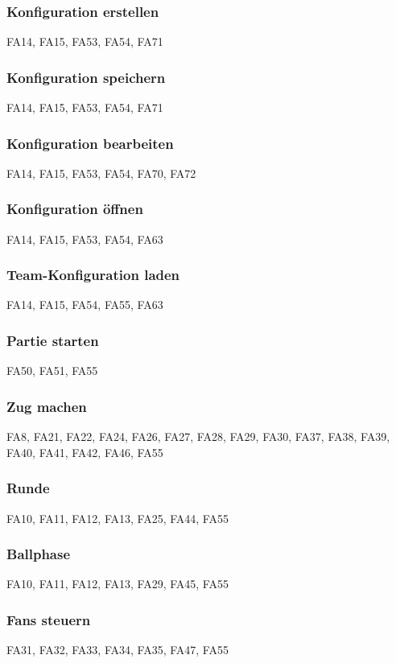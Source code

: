 \subsubsection{Konfiguration erstellen}
FA14,
FA15, 
FA53, 
FA54, 
FA71

\subsubsection{Konfiguration speichern}
FA14,
FA15, 
FA53, 
FA54, 
FA71

\subsubsection{Konfiguration bearbeiten}
FA14,
FA15, 
FA53, 
FA54, 
FA70, 
FA72

\subsubsection{Konfiguration öffnen}
FA14,
FA15, 
FA53, 
FA54, 
FA63

\subsubsection{Team-Konfiguration laden}
FA14,
FA15, 
FA54, 
FA55, 
FA63

\subsubsection{Partie starten}
FA50,
FA51, 
FA55

\subsubsection{Zug machen}
FA8,
FA21, 
FA22, 
FA24, 
FA26, 
FA27, 
FA28, 
FA29, 
FA30, 
FA37, 
FA38, 
FA39, 
FA40, 
FA41, 
FA42, 
FA46, 
FA55

\subsubsection{Runde}
FA10,
FA11, 
FA12, 
FA13, 
FA25, 
FA44, 
FA55

\subsubsection{Ballphase}
FA10,
FA11, 
FA12, 
FA13, 
FA29, 
FA45, 
FA55 

\subsubsection{Fans steuern}
FA31,
FA32, 
FA33, 
FA34, 
FA35, 
FA47, 
FA55 

